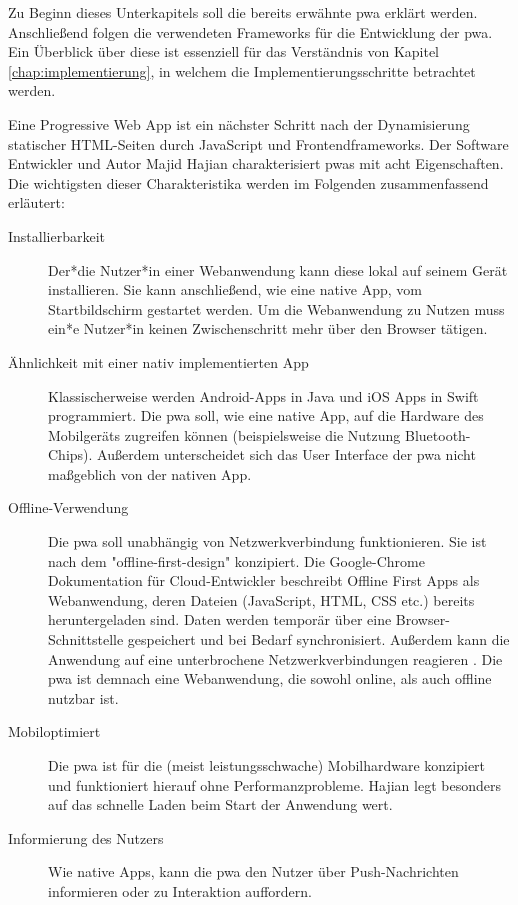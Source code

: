 Zu Beginn dieses Unterkapitels soll die bereits erwähnte \acf{pwa} erklärt werden. Anschließend folgen die verwendeten Frameworks für die Entwicklung der \ac{pwa}. Ein Überblick über diese ist essenziell für das Verständnis von Kapitel \ref{chap:implementierung}, in welchem die Implementierungsschritte betrachtet werden.

Eine Progressive Web App ist ein nächster Schritt nach der Dynamisierung statischer HTML-Seiten durch JavaScript und Frontendframeworks. Der Software Entwickler und Autor Majid Hajian charakterisiert \ac{pwa}s mit acht Eigenschaften. Die wichtigsten dieser Charakteristika werden im Folgenden zusammenfassend erläutert:


\begin{description}
  \item [Installierbarkeit]
	  Der*die Nutzer*in einer Webanwendung kann diese lokal auf seinem Gerät installieren. Sie kann anschließend, wie eine native App, vom Startbildschirm gestartet werden. Um die Webanwendung zu Nutzen muss ein*e Nutzer*in keinen Zwischenschritt mehr über den Browser tätigen.
  
  \item [Ähnlichkeit mit einer nativ implementierten App]  
 	 Klassischerweise werden Android-Apps in Java und iOS Apps in Swift programmiert. Die \ac{pwa} soll, wie eine native App, auf die Hardware des Mobilgeräts zugreifen können (beispielsweise die Nutzung Bluetooth-Chips). Außerdem unterscheidet sich das User Interface der \ac{pwa} nicht maßgeblich von der nativen App. 
  
  \item [Offline-Verwendung] 
  	Die \ac{pwa} soll unabhängig von Netzwerkverbindung funktionieren. Sie ist nach dem "offline-first-design" konzipiert. Die Google-Chrome Dokumentation für Cloud-Entwickler beschreibt Offline First Apps als Webanwendung, deren Dateien (JavaScript, HTML, CSS etc.) bereits heruntergeladen sind. Daten werden temporär über eine Browser-Schnittstelle gespeichert und bei Bedarf synchronisiert. Außerdem kann die Anwendung auf eine unterbrochene Netzwerkverbindungen reagieren \cite{GoogleOfflineApps}. Die \ac{pwa} ist demnach eine Webanwendung, die sowohl online, als auch offline nutzbar ist.

  \item [Mobiloptimiert]  
  	Die \ac{pwa} ist für die (meist leistungsschwache) Mobilhardware konzipiert und funktioniert hierauf ohne Performanzprobleme. Hajian legt besonders auf das schnelle Laden beim Start der Anwendung wert.
  	
  \item [Informierung des Nutzers] 
  	Wie native Apps, kann die \ac{pwa} den Nutzer über Push-Nachrichten informieren oder zu Interaktion auffordern.
\end{description}

